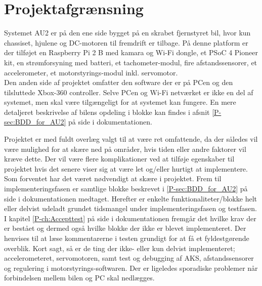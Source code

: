 \chapter{Projektafgrænsning} \label{ch:Projektafgraensning}

Systemet AU2 er på den ene side bygget på en skrabet fjernstyret bil, hvor kun chassiset, hjulene og DC-motoren til fremdrift er tilbage. På denne platform er der tilføjet en Raspberry Pi 2 B med kamara og Wi-Fi dongle, et PSoC 4 Pioneer kit, en strømforsyning med batteri, et tachometer-modul, fire afstandssensorer, et accelerometer, et motorstyrings-modul inkl. servomotor. \\
Den anden side af projektet omfatter den software der er på PCen og den tilsluttede Xbox-360 controller. Selve PCen og Wi-Fi netværket er ikke en del af systemet, men skal være tilgængeligt for at systemet kan fungere.
En mere detaljeret beskrivelse af bilens opdeling i blokke kan findes i afsnit \ref{P-sec:BDD_for_AU2}  på side \pageref{P-sec:BDD_for_AU2} i dokumentationen. \newline

Projektet er med fuldt overlæg valgt til at være ret omfattende, da der således vil være mulighed for at skære ned på områder, hvis tiden eller andre faktorer vil kræve dette. Der vil være flere komplikationer ved at tilføje egenskaber til projektet hvis det senere viser sig at være let og/eller hurtigt at implementere.\\
Som forventet har det været nødvendigt at skære i projektet. Frem til implementeringsfasen er samtlige blokke beskrevet i \ref{P-sec:BDD_for_AU2}  på side \pageref{P-sec:BDD_for_AU2} i dokumentationen medtaget. Herefter er enkelte funktionaliteter/blokke helt eller delvist udeladt grundet tidsmangel under implementeringsfasen og testfasen. I kapitel \ref{P-ch:Accepttest}  på side \pageref{P-ch:Accepttest} i dokumentationen fremgår det hvilke krav der er bestået og dermed også hvilke blokke der ikke er blevet implementeret. Der henvises til at læse kommentarerne i testen grundigt for at få et fyldestgørende overblik. Kort sagt, så er de ting der ikke- eller kun delvist implementeret; accelerometeret, servomotoren, samt test og debugging af AKS, afstandssensorer og regulering i motorstyrings-softwaren. Der er ligeledes sporadiske problemer når forbindelsen mellem bilen og PC skal nedlægges.\\

\clearpage